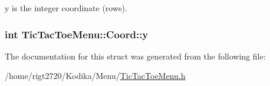 y is the integer coordinate (rows). \hypertarget{structTicTacToeMenu_1_1Coord_a537516d9b1bdfff45765fbd4c7716a37}{
\subsubsection[{y}]{\setlength{\rightskip}{0pt plus 5cm}int Tic\-Tac\-Toe\-Menu\-::\-Coord\-::y}}\label{structTicTacToeMenu_1_1Coord_a537516d9b1bdfff45765fbd4c7716a37}


The documentation for this struct was generated from the following file\-:\begin{DoxyCompactItemize}
\item 
/home/rigt2720/\-Kodika/\-Menu/\hyperlink{TicTacToeMenu_8h}{Tic\-Tac\-Toe\-Menu.\-h}\end{DoxyCompactItemize}
